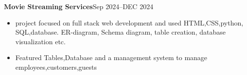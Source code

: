 \textbf{Movie Streaming Services}\hfill Sep 2024--DEC 2024\par
\begin{itemize}
	\item project focused on full stack web development and used HTML,CSS,python, SQL,database. ER-diagram, Schema diagram, table creation, database visualization etc.
	\item Featured Tables,Database and a management system to manage employees,customers,guests
\end{itemize}\vspace{0.1cm}\par